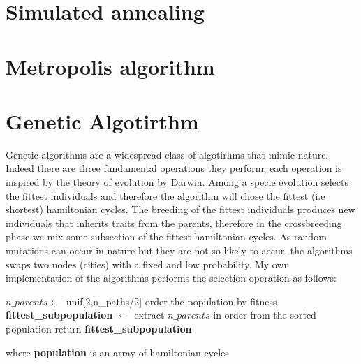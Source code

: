 \documentclass{article}
\begin{document}
\section{Simulated annealing}

\section{Metropolis algorithm}

\section{Genetic Algotirthm}
Genetic algorithms are a widespread class of algotirhms that mimic nature. Indeed there are three fundamental operations they perform, each operation is inspired by the theory of evolution by Darwin. Among a specie evolution selects the fittest individuals and therefore the algorithm will chose the fittest (i.e shortest) hamiltonian cycles. The breeding of the fittest individuals produces new individuals that inherits traits from the parents, therefore in the crossbreeding phase we mix some subsection of the fittest hamiltonian cycles.
As random mutations can occur in nature but they are not so likely to accur, the algorithms swaps two nodes (cities) with a fixed and low probability.
My own implementation of the algorithms performs the selection operation as follows:
\begin{algorithm}[h]
    \begin{algorithmic}[1]
        \State $n\_parents \leftarrow$ unif[2,n\_paths/2]
        \State order the population by fitness
        \State \textbf{fittest\_subpopulation} $\leftarrow$ extract $n\_parents$ in order from the sorted population
        \State return \textbf{fittest\_subpopulation}
       \EndFunction
\end{algorithmic}
\end{algorithm}
\noindent where \textbf{population} is an array of hamiltonian cycles
\end{document}
